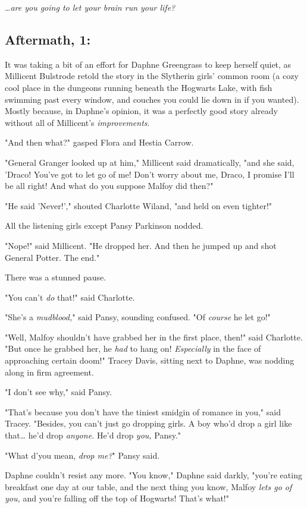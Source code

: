 {\ldots}\emph{are you going to let your brain run your life?}
\sbreak
\subsection{Aftermath, 1:}

It was taking a bit of an effort for Daphne Greengrass to keep herself quiet, 
as Millicent Bulstrode retold the story in the Slytherin girls' common room (a 
cozy cool place in the dungeons running beneath the Hogwarts Lake, with fish 
swimming past every window, and couches you could lie down in if you wanted). 
Mostly because, in Daphne's opinion, it was a perfectly good story already 
without all of Millicent's \emph{improvements}.

"And then what?" gasped Flora and Hestia Carrow.

"General Granger looked up at him," Millicent said dramatically, "and she said, 
'Draco! You've got to let go of me! Don't worry about me, Draco, I promise I'll 
be all right! And what do you suppose Malfoy did then?"

"He said 'Never!'," shouted Charlotte Wiland, "and held on even tighter!"

All the listening girls except Pansy Parkinson nodded.

"Nope!" said Millicent. "He dropped her. And then he jumped up and shot General 
Potter. The end."

There was a stunned pause.

"You can't \emph{do} that!" said Charlotte.

"She's a \emph{mudblood,}" said Pansy, sounding confused. "Of \emph{course} he 
let go!"

"Well, Malfoy shouldn't have grabbed her in the first place, then!" said 
Charlotte. "But once he grabbed her, he \emph{had} to hang on! 
\emph{Especially} in the face of approaching certain doom!" Tracey Davis, 
sitting next to Daphne, was nodding along in firm agreement.

"I don't see why," said Pansy.

"That's because you don't have the tiniest smidgin of romance in you," said 
Tracey. "Besides, you can't just go dropping girls. A boy who'd drop a girl 
like that{\ldots} he'd drop \emph{anyone.} He'd drop \emph{you,} Pansy."

"What d'you mean, \emph{drop me?}" Pansy said.

Daphne couldn't resist any more. "You know," Daphne said darkly, "you're eating 
breakfast one day at our table, and the next thing you know, Malfoy \emph{lets 
go of you,} and you're falling off the top of Hogwarts! That's what!"

